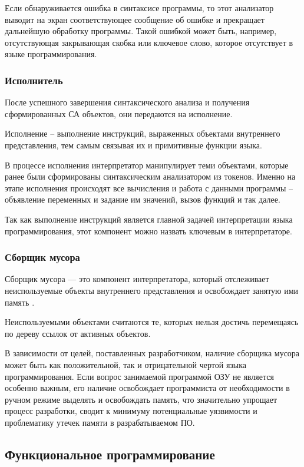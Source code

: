 Если обнаруживается ошибка в синтаксисе программы, то этот анализатор выводит на экран соответствующее сообщение об ошибке и прекращает дальнейшую обработку программы. Такой ошибкой может быть, например, отсутствующая закрывающая скобка или ключевое слово, которое отсутствует в языке программирования.



\subsubsection{Исполнитель}

После успешного завершения синтаксического анализа и получения сформированных СА объектов, они передаются на исполнение.

Исполнение -- выполнение инструкций, выраженных объектами внутреннего представления, тем самым связывая их и примитивные функции языка.

В процессе исполнения интерпретатор манипулирует теми объектами, которые ранее были сформированы синтаксическим анализатором из токенов. Именно на этапе исполнения происходят все вычисления и работа с данными программы -- объявление переменных и задание им значений, вызов функций и так далее.

Так как выполнение инструкций является главной задачей интерпретации языка программирования, этот компонент можно назвать ключевым в интерпретаторе.


\subsubsection{Сборщик мусора}
Сборщик мусора — это компонент интерпретатора, который отслеживает неиспользуемые объекты внутреннего представления и освобождает занятую ими память \cite{e17}.

Неиспользуемыми объектами считаются те, которых нельзя достичь перемещаясь по дереву ссылок от активных объектов.

В зависимости от целей, поставленных разработчиком, наличие сборщика мусора может быть как положительной, так и отрицательной чертой языка программирования. Если вопрос занимаемой программой ОЗУ не является особенно важным, его наличие освобождает программиста от необходимости в ручном режиме выделять и освобождать память, что значительно упрощает процесс разработки, сводит к минимуму потенциальные уязвимости и проблематику утечек памяти в разрабатываемом ПО.


\subsection{Функциональное программирование}

